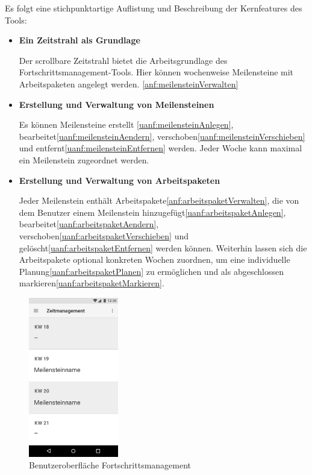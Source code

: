 \documentclass[bibliography=totoc,listof=totoc,BCOR=5mm,DIV=12,oneside]{scrbook}
\begin{document}
\par\bigskip Es folgt eine stichpunktartige Auflistung und Beschreibung der Kernfeatures des Tools:
\begin{itemize}
\item \textbf{Ein Zeitstrahl als Grundlage}
\par Der scrollbare Zeitstrahl bietet die Arbeitsgrundlage des Fortschrittsmanagement-Tools. Hier können wochenweise Meilensteine mit Arbeitspaketen angelegt werden.  \ref{anf:meilensteinVerwalten}
\item \textbf{Erstellung und Verwaltung von Meilensteinen}
\par Es können Meilensteine erstellt \ref{uanf:meilensteinAnlegen}, bearbeitet\ref{uanf:meilensteinAendern}, verschoben\ref{uanf:meilensteinVerschieben} und entfernt\ref{uanf:meilensteinEntfernen} werden. Jeder Woche kann maximal ein Meilenstein zugeordnet werden.
\item \textbf{Erstellung und Verwaltung von Arbeitspaketen}
\par Jeder Meilenstein enthält Arbeitspakete\ref{anf:arbeitspaketVerwalten}, die von dem Benutzer einem Meilenstein hinzugefügt\ref{uanf:arbeitspaketAnlegen}, bearbeitet\ref{uanf:arbeitspaketAendern}, verschoben\ref{uanf:arbeitspaketVerschieben} und gelöscht\ref{uanf:arbeitspaketEntfernen} werden können. Weiterhin lassen sich die Arbeitspakete optional konkreten Wochen zuordnen, um eine individuelle Planung\ref{uanf:arbeitspaketPlanen} zu ermöglichen und als abgeschlossen markieren\ref{uanf:arbeitspaketMarkieren}.
\end{itemize}

\begin{figure}[H]
	\centering
	\includegraphics[width=0.35\textwidth, keepaspectratio]{Bilder/Prototyp/Zeitmanagement.png}
	\caption{Benutzeroberfläche Fortschrittsmanagement}
	\label{img:fortschrittsmanagement}
\end{figure}
\end{document}
